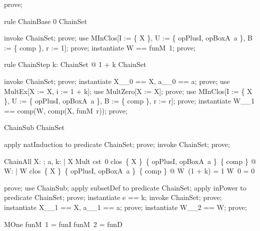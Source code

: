 \documentclass{article}
\begin{document}
\begin{zproof}
prove;
\end{zproof}

\begin{theorem}{rule ChainBase}
  0 \in ChainSet
\end{theorem}

\begin{zproof}
invoke ChainSet;
prove;
use MInClos[I := \{ X \}, U := \{ opPlusI, opBoxA~a \}, B := \{ comp \}, r := 1];
prove;
instantiate W == funM~1;
prove;
\end{zproof}

\begin{theorem}{rule ChainStep}
  \forall k: ChainSet @ 1 + k \in ChainSet
\end{theorem}

\begin{zproof}
invoke ChainSet;
prove;
instantiate X\_\_0 == X, a\_\_0 == a;
prove;
use MultEx[X := X, i := 1 + k];
use MultZero[X := X];
prove;
use MInClos[I := \{ X \}, U := \{ opPlusI, opBoxA~a \}, B := \{ comp \}, r := r];
prove;
instantiate W\_\_1 == comp(W, comp(X, funM~r));
prove;
\end{zproof}

\begin{theorem}{ChainSub}
  \nat \subseteq ChainSet
\end{theorem}

\begin{zproof}
apply natInduction to predicate \nat \subseteq ChainSet;
prove;
invoke ChainSet;
prove;
\end{zproof}

\begin{theorem}{ChainAll}
  \forall X: \nat \fun \nat; a, k: \nat | X \in Mult \land cst~0 \in clos~\{ X \}~\{ opPlusI, opBoxA~a \}~\{ comp \} @
    \exists W: \nat \fun \nat | W \in clos~\{ X \}~\{ opPlusI, opBoxA~a \}~\{ comp \} @ W~(1 + k) = 1 \land W~0 = 0
\end{theorem}

\begin{zproof}
prove;
use ChainSub;
apply subsetDef to predicate \nat \subseteq ChainSet;
apply inPower to predicate \nat \in \power ChainSet;
prove;
instantiate e == k;
invoke ChainSet;
prove;
instantiate X\_\_1 == X, a\_\_1 == a;
prove;
instantiate W\_\_2 == W;
prove;
\end{zproof}

\begin{theorem}{MOne}
  funM~1 = funI \land funM~2 = funD
\end{theorem}
\end{document}
